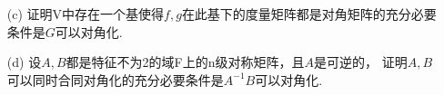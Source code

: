 \begin{itemize}
\begin{itemize}

        \item [(c)] 证明V中存在一个基使得$f,g$在此基下的度量矩阵都是对角矩阵的充分必要条件是$G$可以对角化.
        \vspace{3cm}
        


        \item [(d)] 设$A,B$都是特征不为2的域F上的n级对称矩阵，且$A$是可逆的，
        证明$A,B$可以同时合同对角化的充分必要条件是$A^{-1}B$可以对角化.
        \vspace{3cm}
        
    \end{itemize} 
\end{itemize}

